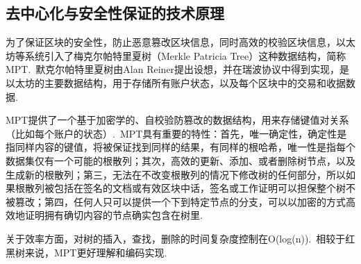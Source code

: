 \documentclass[a4paper,12pt,titlepage]{ctexart}
\begin{document}
\subsection{去中心化与安全性保证的技术原理}
为了保证区块的安全性，防止恶意篡改区块信息，同时高效的校验区块信息，以太坊等系统引入了梅克尔帕特里夏树（Merkle Patricia Tree）这种数据结构，简称MPT.~默克尔帕特里夏树由Alan Reiner提出设想，并在瑞波协议中得到实现，是以太坊的主要数据结构，用于存储所有账户状态，以及每个区块中的交易和收据数据.~\par
MPT提供了一个基于加密学的、自校验防篡改的数据结构，用来存储键值对关系（比如每个账户的状态）.~MPT具有重要的特性：首先，唯一确定性，确定性是指同样内容的键值，将被保证找到同样的结果，有同样的根哈希，唯一性是指每个数据集仅有一个可能的根散列；其次，高效的更新、添加、或者删除树节点，以及生成新的根散列；第三，无法在不改变根散列的情况下修改树的任何部分，所以如果根散列被包括在签名的文档或有效区块中话，签名或工作证明可以担保整个树不被篡改；第四，任何人只可以提供一个下到特定节点的分支，可以以加密的方式高效地证明拥有确切内容的节点确实包含在树里.~\par
关于效率方面，对树的插入，查找，删除的时间复杂度控制在O(log(n)).~相较于红黑树来说，MPT更好理解和编码实现.~

\newpage
\end{document}
